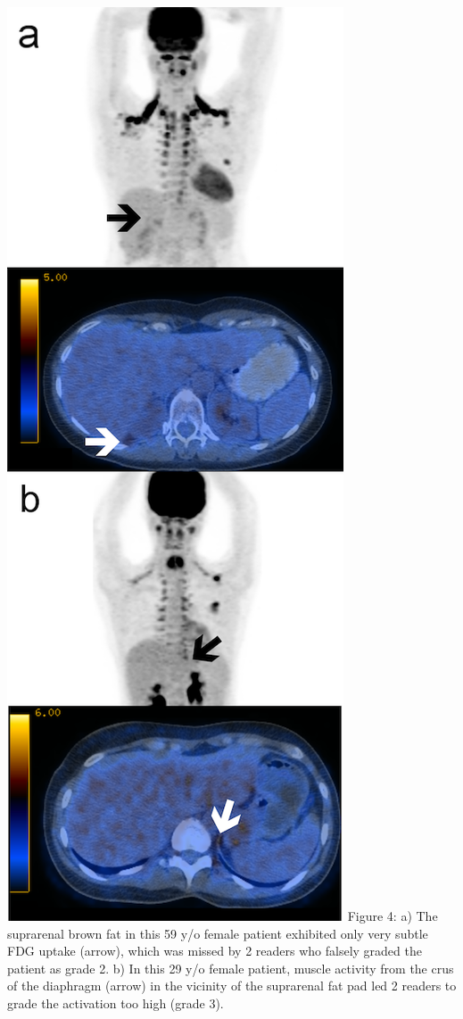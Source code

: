 \documentclass[]{elsarticle} %
\makeatletter
\def\maxwidth{\ifdim\Gin@nat@width>\linewidth\linewidth
\else\Gin@nat@width\fi}
\let\Oldincludegraphics\includegraphics
\renewcommand{\includegraphics}[1]{\Oldincludegraphics[width=\maxwidth]{#1}}
\makeatother
\begin{document}
\includegraphics{Figure_examples.png} Figure 4: a) The suprarenal brown
fat in this 59 y/o female patient exhibited only very subtle FDG uptake
(arrow), which was missed by 2 readers who falsely graded the patient as
grade 2. b) In this 29 y/o female patient, muscle activity from the crus
of the diaphragm (arrow) in the vicinity of the suprarenal fat pad led 2
readers to grade the activation too high (grade 3).
\end{document}
